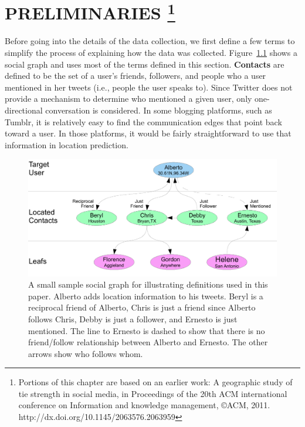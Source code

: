 \chapter{\uppercase{Preliminaries}
\footnote{Portions of this chapter are based on an earlier work:
A geographic study of tie strength in social media, in
Proceedings of the 20th ACM international conference on Information and
knowledge management, \copyright ACM, 2011.
http://dx.doi.org/10.1145/2063576.2063959}
}


Before going into the details of the data collection, we first define a few
terms to simplify the process of explaining how the data was collected.
%
Figure~\ref{fig:Terms} shows a social graph and uses most of the terms
defined in this section.
%
\textbf{Contacts} are defined to be the set of a user's friends, followers, and
people who a user mentioned in her tweets (i.e., people the user speaks to).
%
Since Twitter does not provide a mechanism to determine who mentioned a given
user, only one-directional conversation is considered.
%
In some blogging platforms, such as Tumblr, it is relatively easy to find the
communication edges that point back toward a user.
%
In those platforms, it would be fairly straightforward to use that information
in location prediction.

\begin{figure}[tbh]
\centering
\includegraphics[width=\linewidth]{figures/terms.pdf}
\caption{
A small sample social graph for illustrating definitions used in this paper.
Alberto adds location information to his tweets.
Beryl is a reciprocal friend of Alberto, Chris is just a friend since Alberto
follows Chris, Debby is just a follower, and Ernesto is just mentioned.
The line to Ernesto is dashed to show that there is no friend/follow
relationship between Alberto and Ernesto.
The other arrows show who follows whom.
}
\label{fig:Terms}
\end{figure}

